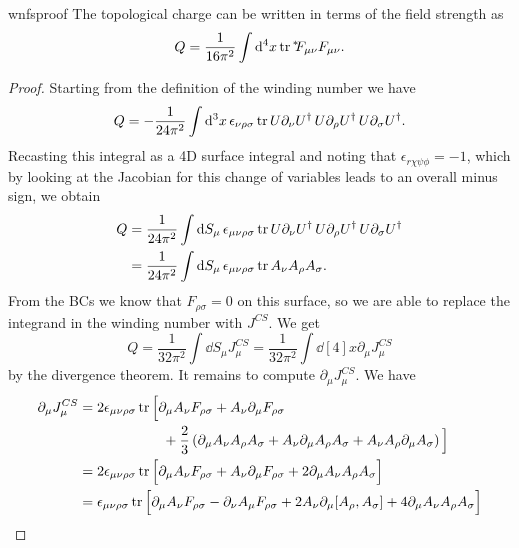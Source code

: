 \begin{proposition}{}{wnfsproof}
The topological charge can be written in terms of the field strength as
$$
  Q=\frac{1}{16\pi^2}\int\dd[4]{x}\tr\dual{F_{\mu\nu}}F_{\mu\nu}.
$$
  \begin{proof} Starting from the definition of the winding number we have
    $$
      Q=-\frac{1}{24\pi^2}\int\dd[3]{x}
        \epsilon_{\nu\rho\sigma}\tr U\partial_\nu U^\dagger\,
        U\partial_\rho U^\dagger\,U\partial_\sigma U^\dagger.
    $$
    Recasting this integral as a 4D surface integral and noting
    that $\epsilon_{r\chi\psi\phi}=-1$, which by looking at the Jacobian
    for this change of variables leads to an overall minus sign, we obtain
    \begin{equation*}\begin{aligned}
      Q&=\frac{1}{24\pi^2}\int\dd{S_\mu}
        \epsilon_{\mu\nu\rho\sigma}\tr U\partial_\nu U^\dagger\,
        U\partial_\rho U^\dagger\,U\partial_\sigma U^\dagger\\
       &=\frac{1}{24\pi^2}\int\dd{S_\mu}
        \epsilon_{\mu\nu\rho\sigma}\tr A_\nu A_\rho A_\sigma.
    \end{aligned}\end{equation*}
    From the BCs we know that $F_{\rho\sigma}=0$ on this surface, so
    we are able to replace the integrand in the winding number
    with $J^{CS}$. We get
    $$
      Q=\frac{1}{32\pi^2}\int\dd{S_\mu}J_\mu^{CS}
       =\frac{1}{32\pi^2}\int\dd[4]{x}\partial_\mu J_\mu^{CS}
    $$
    by the divergence theorem.
    It remains to compute $\partial_\mu J_\mu^{CS}$. We have
    \begin{equation*}
    \begin{aligned}
      \partial_\mu J_\mu^{CS}
       &=2\epsilon_{\mu\nu\rho\sigma}\tr\Big[\partial_\mu A_\nu F_{\rho\sigma}
           +A_\nu\partial_\mu F_{\rho\sigma}\\
       &~~~~~~~~~~~~~~~~~~+\frac{2}{3}\left(\partial_\mu A_\nu A_\rho A_\sigma
              +A_\nu \partial_\mu A_\rho A_\sigma
              +A_\nu A_\rho \partial_\mu A_\sigma\right)\Big]\\
       &=2\epsilon_{\mu\nu\rho\sigma}\tr\Big[\partial_\mu A_\nu F_{\rho\sigma}
           +A_\nu\partial_\mu F_{\rho\sigma}
           +2\partial_\mu A_\nu A_\rho A_\sigma\Big]\\ 
       &=\epsilon_{\mu\nu\rho\sigma}\tr\Big[\partial_\mu A_\nu F_{\rho\sigma}
           -\partial_\nu A_\mu F_{\rho\sigma}
           +2A_\nu\partial_\mu[A_\rho,A_\sigma]
           +4\partial_\mu A_\nu A_\rho A_\sigma\Big]\\

\end{aligned}
\end{equation*}
\end{proof}
\end{proposition}
